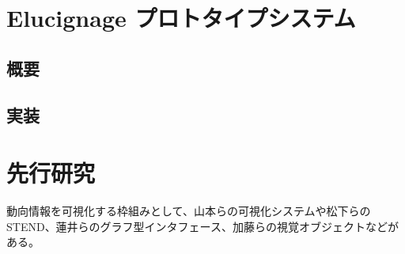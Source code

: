 \documentclass{matsushita-zemi}
\begin{document}
\section{Elucignage プロトタイプシステム}
\subsection{概要}

\subsection{実装}

\section{先行研究}
\label{relatedworks} 
動向情報を可視化する枠組みとして、山本らの可視化システム\cite{タグ付きコーパス}や松下らのSTEND\cite{STEND}、蓮井らのグラフ型インタフェース\cite{比較}、加藤らの視覚オブジェクト\cite{情報編纂研究会}などがある。
\end{document}
